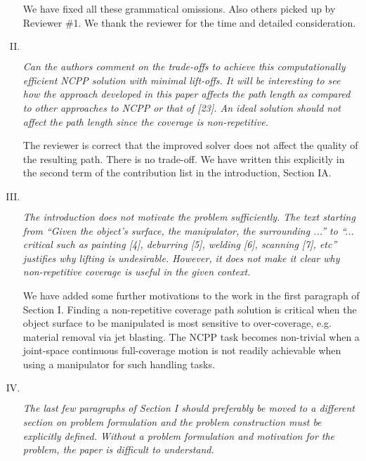\documentclass[11pt]{article}
\newenvironment{reviewer}
{\begin{mdframed}[roundcorner = 10pt,fontcolor=blue!70!black]\itshape}
{\end{mdframed}}
\begin{document}
\begin{enumerate}[I.]
\noindent
We have fixed all these grammatical omissions. Also others picked up by Reviewer \#1. We thank the reviewer for the time and detailed consideration.   
  
  \item $ $
  \begin{reviewer}
    Can the authors comment on the trade-offs to achieve this computationally efficient NCPP solution with minimal lift-offs. It will be interesting to see how the approach developed in this paper affects the path length as compared to other approaches to NCPP or that of [23]. An ideal solution should not affect the path length since the coverage is non-repetitive. 
   \end{reviewer}

\noindent
The reviewer is correct that the improved solver does not affect the quality of the resulting path. 
There is no trade-off. 
We have written this explicitly in the second term of the contribution list in the introduction, Section IA. 

  \item $ $
  \begin{reviewer}
    The introduction does not motivate the problem sufficiently. The text starting from “Given the object’s surface, the manipulator, the surrounding ...” to “... critical such as painting [4], deburring [5], welding [6], scanning [7], etc” justifies why lifting is undesirable. However, it does not make it clear why non-repetitive coverage is useful in the given context. 
   \end{reviewer}

\noindent
We have added some further motivations to the work in the first paragraph of Section I. 
Finding a non-repetitive coverage path solution is critical when the object surface to be manipulated is most sensitive to over-coverage, e.g. material removal via jet blasting.  The NCPP task becomes non-trivial when a joint-space continuous full-coverage motion is not readily achievable when using a manipulator for such handling tasks. 


  \item $ $
  \begin{reviewer}
    The last few paragraphs of Section I should preferably be moved to a different section on problem formulation and the problem construction must be explicitly defined. Without a problem formulation and motivation for the problem, the paper is difficult to understand. 
   \end{reviewer}


\end{enumerate}
\end{document}
